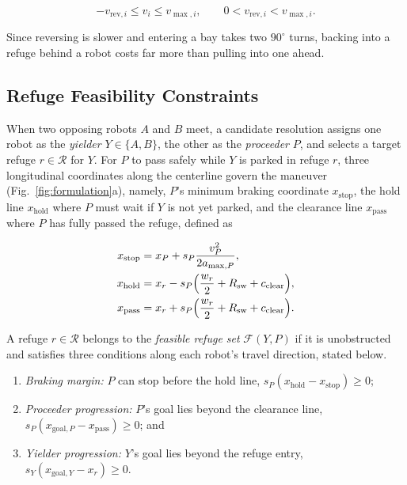 \begin{equation}
-v_{\mathrm{rev},i} \le v_i \le v_{\max,i}, \qquad 0 < v_{\mathrm{rev},i} < v_{\max,i}.
\label{eq:speed_bounds}
\end{equation}

Since reversing is slower and entering a bay takes two $90^\circ$ turns, backing into a refuge behind a robot costs far more than pulling into one ahead.

\subsection{Refuge Feasibility Constraints}
When two opposing robots $A$ and $B$ meet, a candidate resolution assigns one robot as the \emph{yielder} $Y \in \{A, B\}$, the other as the \emph{proceeder} $P$, and selects a target refuge $r \in \mathcal{R}$ for $Y$.
For $P$ to pass safely while $Y$ is parked in refuge $r$, three longitudinal coordinates along the centerline govern the maneuver (Fig.~\ref{fig:formulation}a), namely, $P$'s minimum braking coordinate $x_{\mathrm{stop}}$, the hold line $x_{\mathrm{hold}}$ where $P$ must wait if $Y$ is not yet parked, and the clearance line $x_{\mathrm{pass}}$ where $P$ has fully passed the refuge, defined as

\begin{equation}
\begin{aligned}
x_{\mathrm{stop}} &= x_P + s_P \frac{v_P^2}{2 a_{\max,P}}, \\
x_{\mathrm{hold}} &= x_r - s_P \Bigl(\frac{w_r}{2} + R_{\mathrm{sw}} + c_{\mathrm{clear}}\Bigr), \\
x_{\mathrm{pass}} &= x_r + s_P \Bigl(\frac{w_r}{2} + R_{\mathrm{sw}} + c_{\mathrm{clear}}\Bigr).
\end{aligned}
\label{eq:geom}
\end{equation}

A refuge $r \in \mathcal{R}$ belongs to the \emph{feasible refuge set} $\mathcal{F}(Y, P)$ if it is unobstructed and satisfies three conditions along each robot's travel direction, stated below.
\begin{enumerate}
\item \emph{Braking margin:} $P$ can stop before the hold line, $s_P(x_{\mathrm{hold}} - x_{\mathrm{stop}}) \ge 0$;
\item \emph{Proceeder progression:} $P$'s goal lies beyond the clearance line, $s_P(x_{\mathrm{goal},P} - x_{\mathrm{pass}}) \ge 0$; and
\item \emph{Yielder progression:} $Y$'s goal lies beyond the refuge entry, $s_Y(x_{\mathrm{goal},Y} - x_r) \ge 0$.
\end{enumerate}

